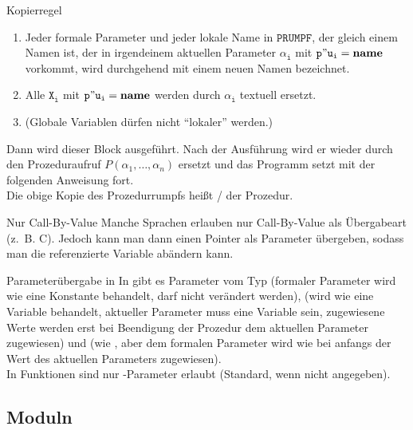 \begin{Def}{Kopierregel}
\begin{enumerate}
        \item Jeder formale Parameter und jeder lokale Name in
        $\mathtt{PRUMPF}$, der gleich einem Namen ist, der in irgendeinem
        aktuellen Parameter $\mathtt{\alpha_i}$ mit
        $\mathtt{p"u_i = \mathbf{name}}$ vorkommt, wird durchgehend mit einem
        neuen Namen bezeichnet.

        \item Alle $\mathtt{X_i}$ mit $\mathtt{p"u_i = \mathbf{name}}$ werden
        durch $\mathtt{\alpha_i}$ textuell ersetzt.

        \item (Globale Variablen dürfen nicht "`lokaler"' werden.)
    \end{enumerate}

    Dann wird dieser Block ausgeführt.
    Nach der Ausführung wird er wieder durch den Prozeduraufruf
    $P(\alpha_1, \ldots, \alpha_n)$ ersetzt und das Programm setzt
    mit der folgenden Anweisung fort. \\
    Die obige Kopie des Prozedurrumpfs heißt
    / der Prozedur.
\end{Def}

\begin{Def}{Nur Call-By-Value}
    Manche Sprachen erlauben nur Call-By-Value als Übergabeart (z.~B. C).
    Jedoch kann man dann einen Pointer als Parameter übergeben, sodass
    man die referenzierte Variable abändern kann.
\end{Def}

\begin{Def}{Parameterübergabe in \Ada{}}
    In \Ada{} gibt es Parameter vom Typ  (formaler Parameter wird
    wie eine Konstante behandelt, darf nicht verändert werden), 
    (wird wie eine Variable behandelt, aktueller Parameter muss eine Variable
    sein, zugewiesene Werte werden erst bei Beendigung der Prozedur dem
    aktuellen Parameter zugewiesen) und 
    (wie , aber dem formalen Parameter
    wird wie bei  anfangs der Wert des aktuellen Parameters
    zugewiesen). \\
    In Funktionen sind nur -Parameter erlaubt
    (Standard, wenn nicht angegeben).
\end{Def}

\subsection{%
    Moduln%
}

